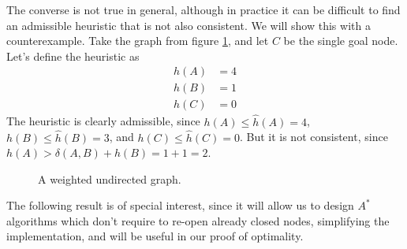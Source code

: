 \documentclass[a4paper,10pt]{report}
\begin{document}
The converse is not true in general, although in practice it can be difficult to find an admissible heuristic that is not also consistent. We will show this with a counterexample. Take the graph from figure \ref{fig:heuristic}, and let $C$ be the single goal node. Let's define the heuristic as
\begin{align*}
h(A) &= 4\\
h(B) &= 1\\
h(C) &= 0
\end{align*}
The heuristic is clearly admissible, since $h(A) \leq \hat{h}(A) = 4$, $h(B) \leq \hat{h}(B) = 3$, and $h(C) \leq \hat{h}(C) = 0$. But it is not consistent, since $h(A) > \delta(A, B) + h(B) = 1 + 1 = 2$.

\begin{figure}
\centering
{}
\caption{A weighted undirected graph.}
\label{fig:heuristic}
\end{figure}

The following result is of special interest, since it will allow us to design $A^*$ algorithms which don't require to re-open already closed nodes, simplifying the implementation, and will be useful in our proof of optimality.
\end{document}
